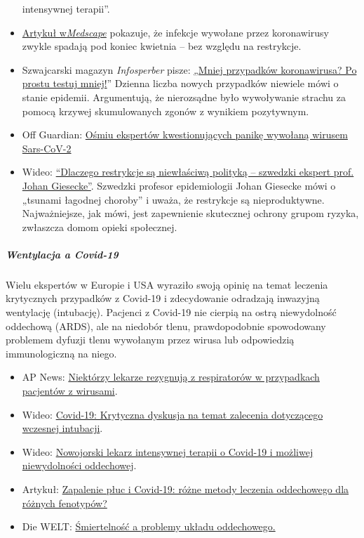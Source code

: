 \begin{itemize}
  intensywnej terapii''.
\item
  \href{https://emedicine.medscape.com/article/227820-overview}{Artykuł
  w}\emph{\href{https://emedicine.medscape.com/article/227820-overview}{Medscape}}
  pokazuje, że infekcje wywołane przez koronawirusy zwykle spadają pod
  koniec kwietnia -- bez względu na restrykcje.
\item
  Szwajcarski magazyn \emph{Infosperber} pisze:
  \href{https://www.infosperber.ch/Artikel/Gesundheit/Weniger-Corona-Falle-Einfach-weniger-testen}{„Mniej
  przypadków koronawirusa? Po prostu testuj mniej!}'' Dzienna liczba
  nowych przypadków niewiele mówi o stanie epidemii. Argumentują, że
  nierozsądne było wywoływanie strachu za pomocą krzywej skumulowanych
  zgonów z wynikiem pozytywnym.
\item
  Off Guardian:
  \href{https://off-guardian.org/2020/04/17/8-more-experts-questioning-the-coronavirus-panic/}{Ośmiu
  ekspertów kwestionujących panikę wywołaną wirusem Sars-CoV-2}
\item
  Wideo: \href{https://www.youtube.com/watch?v=bfN2JWifLCY}{``Dlaczego
  restrykcje są niewłaściwą polityką -- szwedzki ekspert prof. Johan
  Giesecke''}. Szwedzki profesor epidemiologii Johan Giesecke mówi o
  „tsunami łagodnej choroby'' i uważa, że restrykcje są nieproduktywne.
  Najważniejsze, jak mówi, jest zapewnienie skutecznej ochrony grupom
  ryzyka, zwłaszcza domom opieki społecznej.
\end{itemize}

\hypertarget{wentylacja-a-covid-19}{%
\subparagraph{\texorpdfstring{\textbf{Wentylacja a
Covid-19}}{Wentylacja a Covid-19}}\label{wentylacja-a-covid-19}}

Wielu ekspertów w Europie i USA wyraziło swoją opinię na temat leczenia
krytycznych przypadków z Covid-19 i zdecydowanie odradzają inwazyjną
wentylację (intubację). Pacjenci z Covid-19 nie cierpią na ostrą
niewydolność oddechową (ARDS), ale na niedobór tlenu, prawdopodobnie
spowodowany problemem dyfuzji tlenu wywołanym przez wirusa lub
odpowiedzią immunologiczną na niego.

\begin{itemize}
\tightlist
\item
  AP News:
  \href{https://apnews.com/8ccd325c2be9bf454c2128dcb7bd616d}{Niektórzy
  lekarze rezygnują z respiratorów w przypadkach pacjentów z wirusami}.
\item
  Wideo: \href{https://www.youtube.com/watch?v=QPlEUAVjxV8}{Covid-19:
  Krytyczna dyskusja na temat zalecenia dotyczącego wczesnej intubacji}.
\item
  Wideo: \href{https://www.youtube.com/watch?v=NmRlvX3VrAQ}{Nowojorski
  lekarz intensywnej terapii o Covid-19 i możliwej niewydolności
  oddechowej}.
\item
  Artykuł:
  \href{https://link.springer.com/article/10.1007/s00134-020-06033-2}{Zapalenie
  płuc i Covid-19: różne metody leczenia oddechowego dla różnych
  fenotypów?}
\item
  Die WELT:
  \href{https://www.welt.de/vermischtes/article207221877/Corona-Pandemie-Sterberate-bei-Beatmungspatienten-gibt-Raetsel-auf.html}{Śmiertelność
  a problemy układu oddechowego.}
\end{itemize}

